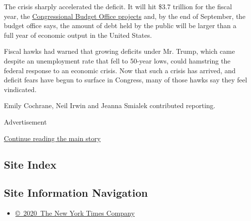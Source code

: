 The crisis sharply accelerated the deficit. It will hit \$3.7 trillion
for the fiscal year, the
\href{https://www.cbo.gov/publication/56335}{Congressional Budget Office
projects} and, by the end of September, the budget office says, the
amount of debt held by the public will be larger than a full year of
economic output in the United States.

Fiscal hawks had warned that growing deficits under Mr. Trump, which
came despite an unemployment rate that fell to 50-year lows, could
hamstring the federal response to an economic crisis. Now that such a
crisis has arrived, and deficit fears have begun to surface in Congress,
many of those hawks say they feel vindicated.

Emily Cochrane, Neil Irwin and Jeanna Smialek contributed reporting.

Advertisement

\protect\hyperlink{after-bottom}{Continue reading the main story}

\hypertarget{site-index}{%
\subsection{Site Index}\label{site-index}}

\hypertarget{site-information-navigation}{%
\subsection{Site Information
Navigation}\label{site-information-navigation}}

\begin{itemize}
\tightlist
\item
  \href{https://help.nytimes3xbfgragh.onion/hc/en-us/articles/115014792127-Copyright-notice}{©~2020~The
  New York Times Company}
\end{itemize}

